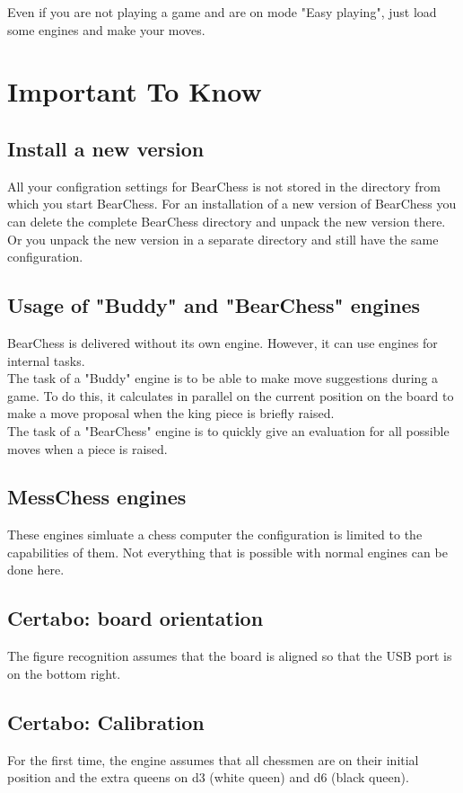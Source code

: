 \documentclass[11pt,a4paper]{article}
\begin{document}
Even if you are not playing a game and are on mode "Easy playing", just load some engines and make your moves.

\section{Important To Know}

\subsection{Install a new version}
All your configration settings for BearChess is not stored in the directory from which you start BearChess. For an installation of a new version of BearChess you can delete the complete BearChess directory and unpack the new version there. Or you unpack the new version in a separate directory and still have the same configuration.

\subsection{Usage of "Buddy" and "BearChess" engines} \label{BuddyBearChessEngines}
BearChess is delivered without its own engine. However, it can use engines for internal tasks.\\
The task of a "Buddy" engine is to be able to make move suggestions during a game. To do this, it calculates in parallel on the current position on the board to make a move proposal when the king piece is briefly raised.\\
The task of a "BearChess" engine is to quickly give an evaluation for all possible moves when a piece is raised.

\subsection{MessChess engines}
These engines simluate a chess computer the configuration is limited to the capabilities of them. Not everything that is possible with normal engines can be done here. 

\subsection{Certabo: board orientation}
The figure recognition assumes that the board is aligned so that the USB port is on the bottom right.

\subsection{Certabo: Calibration}
For the first time, the engine assumes that all chessmen are on their initial position and the extra queens on d3 (white queen) and d6 (black queen).
\end{document}
